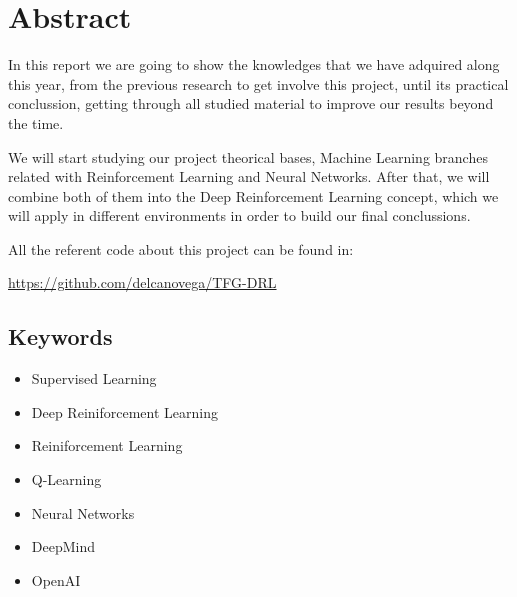 \chapter*{Abstract}

In this report we are going to show the knowledges that we have adquired along this year, from the previous research to get involve this project, until its practical conclussion, getting through all studied material to improve our results beyond the time.

We will start studying our project theorical bases, Machine Learning branches related with Reinforcement Learning and Neural Networks. After that, we will combine both of them into the Deep Reinforcement Learning concept, which we will apply in different environments in order to build our final conclussions.

All the referent code about this project can be found in:

\url{https://github.com/delcanovega/TFG-DRL}

\section*{Keywords}

\begin{itemize}
    \item Supervised Learning
    \item Deep Reiniforcement Learning
    \item Reiniforcement Learning
    \item Q-Learning
    \item Neural Networks
    \item DeepMind 
    \item OpenAI
\end{itemize}
   



